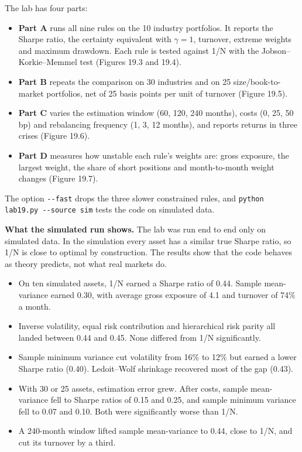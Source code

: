 The lab has four parts:

\begin{itemize}
  \item \textbf{Part A} runs all nine rules on the 10 industry portfolios. It reports the Sharpe ratio, the certainty equivalent with $\gamma = 1$, turnover, extreme weights and maximum drawdown. Each rule is tested against 1/N with the Jobson--Korkie--Memmel test (Figures 19.3 and 19.4).
  \item \textbf{Part B} repeats the comparison on 30 industries and on 25 size/book-to-market portfolios, net of 25 basis points per unit of turnover (Figure 19.5).
  \item \textbf{Part C} varies the estimation window (60, 120, 240 months), costs (0, 25, 50 bp) and rebalancing frequency (1, 3, 12 months), and reports returns in three crises (Figure 19.6).
  \item \textbf{Part D} measures how unstable each rule's weights are: gross exposure, the largest weight, the share of short positions and month-to-month weight changes (Figure 19.7).
\end{itemize}

{\sloppy The option \texttt{-{}-fast} drops the three slower constrained rules, and \texttt{python lab19.py -{}-source sim} tests the code on simulated data.\par}

\textbf{What the simulated run shows.} The lab was run end to end only on simulated data. In the simulation every asset has a similar true Sharpe ratio, so 1/N is close to optimal by construction. The results show that the code behaves as theory predicts, not what real markets do.

\begin{itemize}
  \item On ten simulated assets, 1/N earned a Sharpe ratio of 0.44. Sample mean-variance earned 0.30, with average gross exposure of 4.1 and turnover of 74\% a month.
  \item Inverse volatility, equal risk contribution and hierarchical risk parity all landed between 0.44 and 0.45. None differed from 1/N significantly.
  \item Sample minimum variance cut volatility from 16\% to 12\% but earned a lower Sharpe ratio (0.40). Ledoit--Wolf shrinkage recovered most of the gap (0.43).
  \item With 30 or 25 assets, estimation error grew. After costs, sample mean-variance fell to Sharpe ratios of 0.15 and 0.25, and sample minimum variance fell to 0.07 and 0.10. Both were significantly worse than 1/N.
  \item A 240-month window lifted sample mean-variance to 0.44, close to 1/N, and cut its turnover by a third.
\end{itemize}

